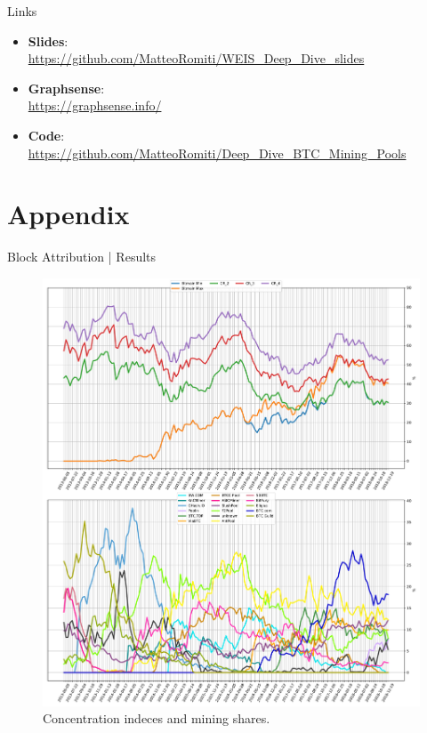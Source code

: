 \documentclass[10pt]{beamer}
\begin{document}
\begin{frame}[fragile]{Links}
    \begin{itemize}
        \item \textbf{Slides}:\\ \url{https://github.com/MatteoRomiti/WEIS_Deep_Dive_slides} 
        \item \textbf{Graphsense}:\\ \url{https://graphsense.info/} 
        \item \textbf{Code}:\\ \url{https://github.com/MatteoRomiti/Deep_Dive_BTC_Mining_Pools} 
    \end{itemize}
\end{frame}


%   
%   

\section{Appendix}
\begin{frame}[fragile]{Block Attribution | Results}
    \begin{figure}
        \centering
        \includegraphics[width=.6\textwidth]{images/mining_distribution_157.pdf}
        \caption{Concentration indeces and mining shares.} \label{fig:mining_distribution}
    \end{figure}
\end{frame}
\end{document}
